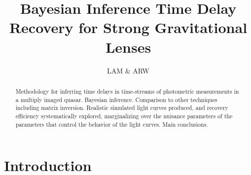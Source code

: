 \documentclass{emulateapj}
\begin{document}
\title{Bayesian Inference Time Delay Recovery for Strong Gravitational Lenses}

\author{LAM \& ARW}


\begin{abstract}
Methodology for inferring time delays in time-streams of photometric
measurements in a multiply imaged quasar.  Bayesian
inference. Comparison to other techniques including matrix inversion.
Realistic simulated light curves produced, and recovery efficiency
systematically explored, marginalizing over the nuisance parameters of
the parameters that control the behavior of the light curves. Main
conclusions.
\end{abstract}
 

\section{Introduction}



\end{document}
